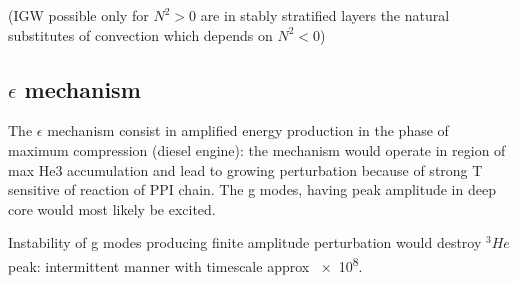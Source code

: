 (IGW possible only for $N^2>0$ are in stably stratified layers the natural substitutes of convection which depends on $N^2<0$)

\subsection{$\epsilon$ mechanism}

The $\epsilon$ mechanism consist in amplified energy production in the phase of maximum compression (diesel engine): the mechanism would operate in region of max He3 accumulation and lead to growing perturbation because of strong T sensitive of  reaction of PPI chain. The g modes, having peak amplitude in deep core would most likely be excited.

Instability of g modes producing finite amplitude perturbation would destroy $^3He$ peak: intermittent manner with timescale approx \SI{e8}{\year}.

\stopcontents[chapters]
